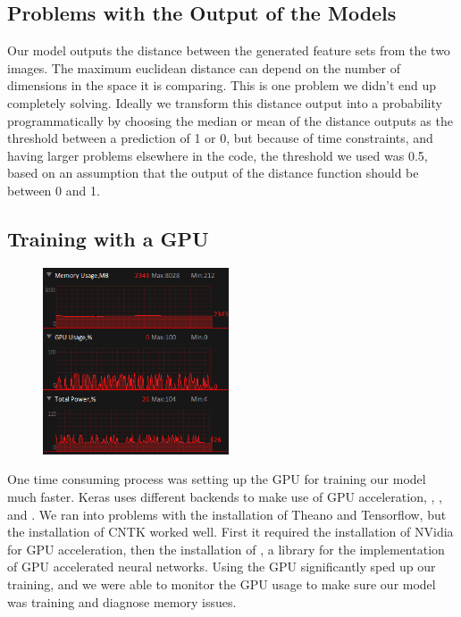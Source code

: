 \documentclass[a4paper, 11pt]{article}
\begin{document}
\subsection{Problems with the Output of the Models}

Our model outputs the distance between the generated feature sets from the two images. The maximum euclidean distance can depend on the number of dimensions in the space it is comparing. This is one problem we didn’t end up completely solving. Ideally we transform this distance output into a probability programmatically by choosing the median or mean of the distance outputs as the threshold between a prediction of 1 or 0, but because of time constraints, and having larger problems elsewhere in the code, the threshold we used was 0.5, based on an assumption that the output of the distance function should be between 0 and 1.

\subsection{Training with a GPU}

\begin{figure}
  \includegraphics[width=5.5cm]{GPU.png}
\end{figure}
One time consuming process was setting up the GPU for training our model much faster. Keras uses different backends to make use of GPU acceleration, , , and . We ran into problems with the installation of Theano and Tensorflow, but the installation of CNTK worked well. First it required the installation of NVidia  for GPU acceleration, then the installation of , a library for the implementation of GPU accelerated neural networks. Using the GPU significantly sped up our training, and we were able to monitor the GPU usage to make sure our model was training and diagnose memory issues. 
\end{document}
